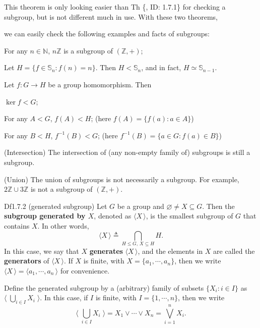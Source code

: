 \documentclass{article}
\begin{document}
\begin{Rmk}{}
    This theorem is only looking easier than Th \{, ID: 1.7.1\} for checking a subgroup, but is not different much in use. With these two theorems, \textcolor{Th}{we can easily check the following examples and facts of subgroups:
    \begin{compactenum}
        \item For any $n\in\mathbb{N}$, $n\mathbb{Z}$ is a subgroup of $(\mathbb{Z}, +)$;
        \item Let $H = \{f\in\mathbb{S}_n: f(n) = n\}$. Then $H<\mathbb{S}_n$, and in fact, $H\simeq\mathbb{S}_{n-1}$.
        \item Let $f: G\to H$ be a group homomorphism. Then 
        \begin{compactenum}
            \item $\ker f < G$;
            \item For any $A < G$, $f(A) < H$; (here $f(A) = \{f(a): a\in A\}$)
            \item For any $B < H$, $f^{-1}(B) < G$; (here $f^{-1}(B) = \{a\in G: f(a)\in B\}$)
        \end{compactenum}
        \item (Intersection) The intersection of (any non-empty family of) subgroups is still a subgroup.
        \item (Union) The union of subgroups is not necessarily a subgroup. For example, $2\mathbb{Z}\cup 3\mathbb{Z}$ is not a subgroup of $(\mathbb{Z}, +)$.
    \end{compactenum}}
\end{Rmk}

\begin{Df}{Df1.7.2 (generated subgroup)}
    Let $G$ be a group and $\varnothing\neq X\subseteq G$. Then the \textbf{subgroup generated by $X$}, denoted as $\langle X\,\rangle$, is the smallest subgroup of $G$ that contains $X$. In other words, 
    $$ \langle X\,\rangle \triangleq \bigcap_{H\leq G,\, X\subseteq H} H. $$
    In this case, we say that $X$ \textbf{generates} $\langle X\,\rangle$, and the elements in $X$ are called the \textbf{generators} of $\langle X\,\rangle$. If $X$ is finite, with $X = \{a_1, \cdots, a_n\}$, then we write $\langle X\,\rangle = \langle a_1, \cdots, a_n\,\rangle$ for convenience.
\end{Df}

\begin{Rmk}{}
    \textcolor{Df}{Define the generated subgroup by a (arbitrary) family of subsets $\{X_i: i\in I\}$ as $\langle\; \bigcup_{i\in I} X_i\;\rangle$. In this case, if $I$ is finite, with $I = \{1, \cdots, n\}$, then we write
    $$ \langle\; \bigcup_{i\in I} X_i\;\rangle = X_1\vee\cdots\vee X_n = \bigvee_{i=1}^n X_i. $$}
\end{Rmk}
\end{document}
